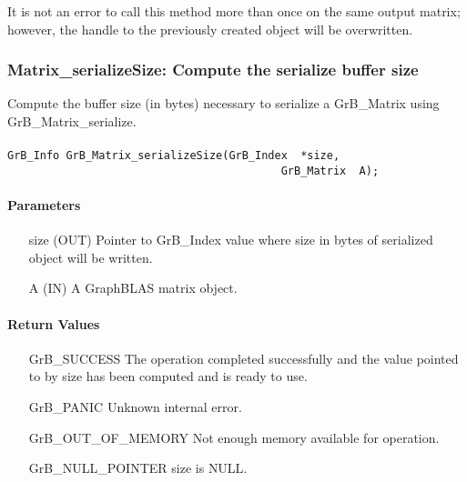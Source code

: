 It is not an error to call this method more than once on the same output matrix;  
however, the handle to the previously created object will be overwritten. 


\subsubsection{{\sf Matrix\_serializeSize}: Compute the serialize buffer size}
\label{Sec:Matrix_serializeSize}

Compute the buffer size (in bytes) necessary to serialize a {\sf GrB\_Matrix} using {\sf GrB\_Matrix\_serialize}.

\paragraph{\syntax}

\begin{Verbatim}[samepage=true]
        GrB_Info GrB_Matrix_serializeSize(GrB_Index  *size,
                                          GrB_Matrix  A);
\end{Verbatim}

\paragraph{Parameters}

\begin{itemize}[leftmargin=1.1in]
    \item[{\sf size}] ({\sf OUT}) Pointer to {\sf GrB\_Index} value where size in bytes of serialized object will be written.
    \item[{\sf A}]      ({\sf IN}) A GraphBLAS matrix object.
\end{itemize}

\paragraph{Return Values}

\begin{itemize}[leftmargin=2.3in]
    \item[{\sf GrB\_SUCCESS}]         The operation completed successfully and
       the value pointed to by {\sf *size} has been computed and is ready to use.

    \item[{\sf GrB\_PANIC}]           Unknown internal error.
    
    \item[{\sf GrB\_OUT\_OF\_MEMORY}] Not enough memory available for operation.
    
    \item[{\sf GrB\_NULL\_POINTER}]  {\sf size} is {\sf NULL}.
\end{itemize}

